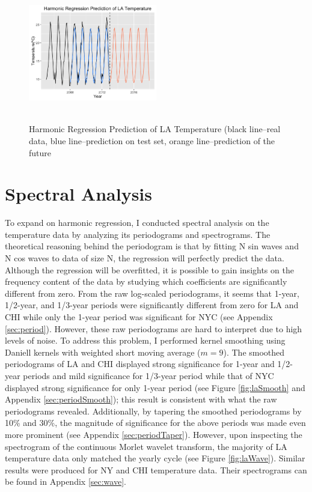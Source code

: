 \documentclass[12pt]{article}
\begin{document}
\begin{figure}[H]
    \centering
    \includegraphics[width=0.5\textwidth, height=6cm]{Figures/laHar.png}
    \caption{Harmonic Regression Prediction of LA Temperature (black line--real data, blue line--prediction on test set, orange line--prediction of the future}
    \label{fig:laHar}
\end{figure}




\section{Spectral Analysis}
To expand on harmonic regression, I conducted spectral analysis on the temperature data by analyzing its periodograms and spectrograms. The theoretical reasoning behind the periodogram is that by fitting N sin waves and N cos waves to data of size N, the regression will perfectly predict the data. Although the regression will be overfitted, it is possible to gain insights on the frequency content of the data by studying which coefficients are significantly different from zero. From the raw log-scaled periodograms, it seems that 1-year, 1/2-year, and 1/3-year periods were significantly different from zero for LA and CHI while only the 1-year period was significant for NYC (see Appendix \ref{sec:period}). However, these raw periodograms are hard to interpret due to high levels of noise. To address this problem, I performed kernel smoothing using Daniell kernels with weighted short moving average ($m=9$). The smoothed periodograms of LA and CHI displayed strong significance for 1-year and 1/2-year periods and mild significance for 1/3-year period while that of NYC displayed strong significance for only 1-year period (see Figure \ref{fig:laSmooth} and Appendix \ref{sec:periodSmooth}); this result is consistent with what the raw periodograms revealed. Additionally, by tapering the smoothed periodograms by 10\% and 30\%, the magnitude of significance for the above periods was made even more prominent (see Appendix \ref{sec:periodTaper}). However, upon inspecting the spectrogram of the continuous Morlet wavelet transform, the majority of LA temperature data only matched the yearly cycle (see Figure \ref{fig:laWave}). Similar results were produced for NY and CHI temperature data. Their spectrograms can be found in Appendix \ref{sec:wave}. 
\end{document}
